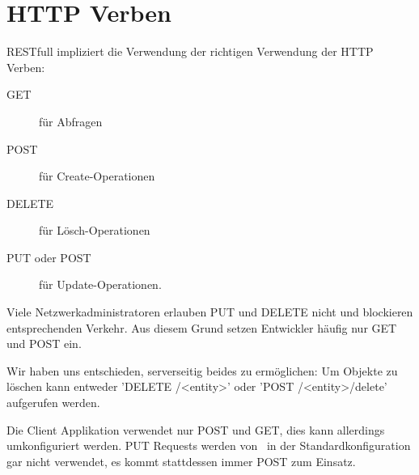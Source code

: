 \section{HTTP Verben}
		RESTfull impliziert die Verwendung der richtigen Verwendung der HTTP Verben: 
		\begin{description}
			\item[GET] für Abfragen
			\item[POST] für Create-Operationen
			\item[DELETE] für Lösch-Operationen
			\item[PUT oder POST] für Update-Operationen.
		\end{description}
		
		Viele Netzwerkadministratoren erlauben PUT und DELETE nicht und blockieren entsprechenden Verkehr. Aus diesem Grund setzen Entwickler häufig nur GET und POST ein.
		
		Wir haben uns entschieden, serverseitig beides zu ermöglichen:
		Um Objekte zu löschen kann entweder 'DELETE /<entity>' oder 'POST /<entity>/delete' aufgerufen werden.
		
		Die Client Applikation verwendet nur POST und GET, dies kann allerdings umkonfiguriert werden.
		PUT Requests werden von \eeppi\ in der Standardkonfiguration gar nicht verwendet,
		es kommt stattdessen immer POST zum Einsatz.
